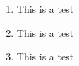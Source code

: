 \documentclass{article}
\begin{document}
\begin{enumerate}[label=H\arabic*.]
  \item This is a test
  \item This is a test
  \item This is a test
\end{enumerate}
\end{document}
